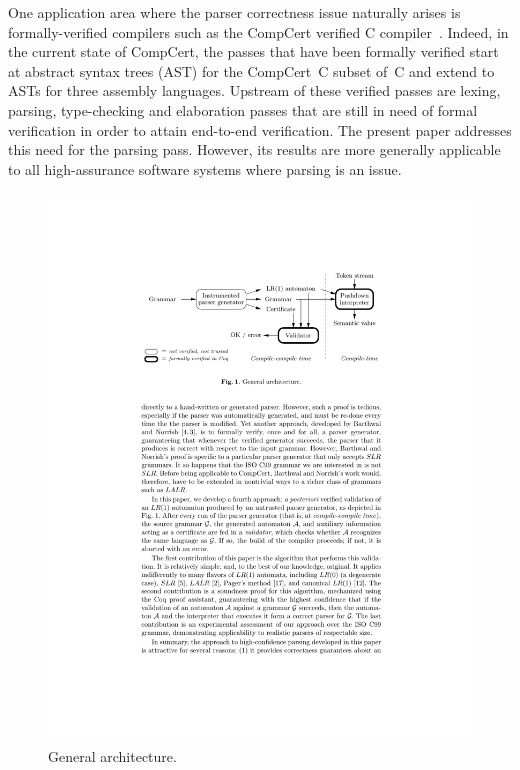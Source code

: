 \documentclass{llncs}
\begin{document}
One application area where the parser correctness issue naturally
arises is formally-verified compilers such as the CompCert verified C
compiler~\cite{Leroy-Compcert-CACM}.
Indeed, in the current state of CompCert, the passes that
have been formally verified start at abstract syntax trees (AST) for
the CompCert~C subset of~C and extend to ASTs for three assembly
languages.  Upstream of these verified passes are lexing, parsing,
type-checking and elaboration passes that are still in need of formal
verification in order to attain end-to-end verification.  The present
paper addresses this need for the parsing pass.  However, its
results are more generally applicable to all high-assurance software
systems where parsing is an issue.

%
\begin{figure}
\begin{center}
\includegraphics{figure}
\end{center}
\caption{General architecture.}
\label{fig-archi}
\end{figure}
\end{document}
